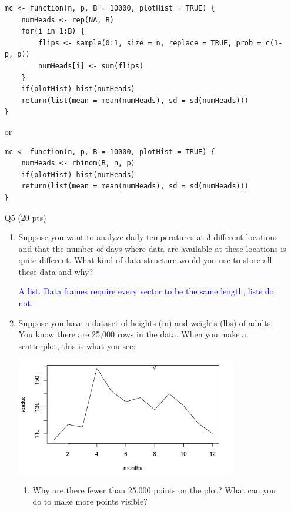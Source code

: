 \documentclass[12pt]{article}
\theoremstyle{Conjecture}
\theoremstyle{example}
\theoremstyle{remark}
\theoremstyle{lemma}
\theoremstyle{definition}
\theoremstyle{corol}
\theoremstyle{proposition}
\theoremstyle{condition}
\begin{document}
\begin{enumerate}
  \begin{verbatim}
mc <- function(n, p, B = 10000, plotHist = TRUE) {
    numHeads <- rep(NA, B)
    for(i in 1:B) {
        flips <- sample(0:1, size = n, replace = TRUE, prob = c(1-p, p))
        numHeads[i] <- sum(flips)
    }
    if(plotHist) hist(numHeads)
    return(list(mean = mean(numHeads), sd = sd(numHeads)))
}
  \end{verbatim}

  or

  \begin{verbatim}
mc <- function(n, p, B = 10000, plotHist = TRUE) {
    numHeads <- rbinom(B, n, p)
    if(plotHist) hist(numHeads)
    return(list(mean = mean(numHeads), sd = sd(numHeads)))
}
  \end{verbatim}

 \newpage

\item [Q5] (20 pts)
\begin{enumerate}
\item Suppose you want to analyze daily temperatures at 3 different
locations and that the number of days where data are available at
these locations is quite different. What kind of data structure would
you use to store all these data and why? 

\vspace{0.25in}
\textcolor{blue}{A list. Data frames require every vector to be the same length, lists do not.}
\vspace{0.25in}

\item Suppose you have a dataset of heights (in) and weights (lbs) of adults. You know there are 25,000 rows in the data. When you make a scatterplot, this is what you see:
\begin{center}
  \includegraphics[width=0.8\textwidth]{plot.png}
\end{center}
\begin{enumerate}
  \item Why are there fewer than 25,000 points on the plot? What can you do to make more points visible?


\end{enumerate}
\end{enumerate}
\end{enumerate}
\end{document}
